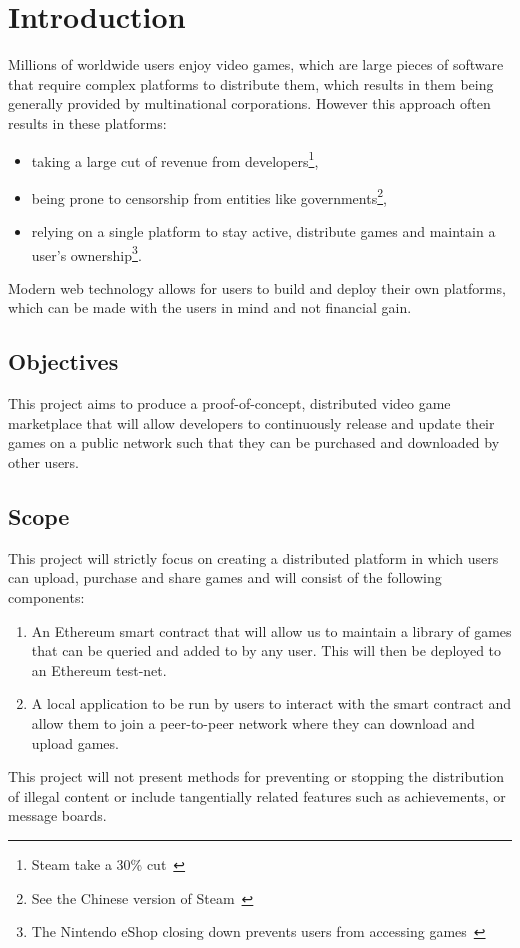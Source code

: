 
\chapter{Introduction}\label{sec:problem}

Millions of worldwide users enjoy video games, which are large pieces of software that require complex platforms to distribute them, which results in them being generally provided by multinational corporations. However this approach often results in these platforms:

\begin{itemize}
  \item taking a large cut of revenue from developers\footnote{Steam take a 30\% cut~\cite{marks_report_2019,brown_valve_2021}},
  \item being prone to censorship from entities like governments\footnote{See the Chinese version of Steam~\cite{noauthor_steam_nodate-1}},
  \item relying on a single platform to stay active, distribute games and maintain a user's ownership\footnote{The Nintendo eShop closing down prevents users from accessing games~\cite{noauthor_nintendo_2022}}.
\end{itemize}

\newparagraph
Modern web technology allows for users to build and deploy their own platforms, which can be made with the users in mind and not financial gain. 

\section{Objectives}

This project aims to produce a proof-of-concept, distributed video game marketplace that will allow developers to continuously release and update their games on a public network such that they can be purchased and downloaded by other users.

\section{Scope}

This project will strictly focus on creating a distributed platform in which users can upload, purchase and share games and will consist of the following components:

\begin{enumerate}
  \item An Ethereum smart contract that will allow us to maintain a library of games that can be queried and added to by any user. This will then be deployed to an Ethereum test-net.
  \item A local application to be run by users to interact with the smart contract and allow them to join a peer-to-peer network where they can download and upload games.
\end{enumerate}

\newparagraph
This project will not present methods for preventing or stopping the distribution of illegal content or include tangentially related features such as achievements, or message boards.
